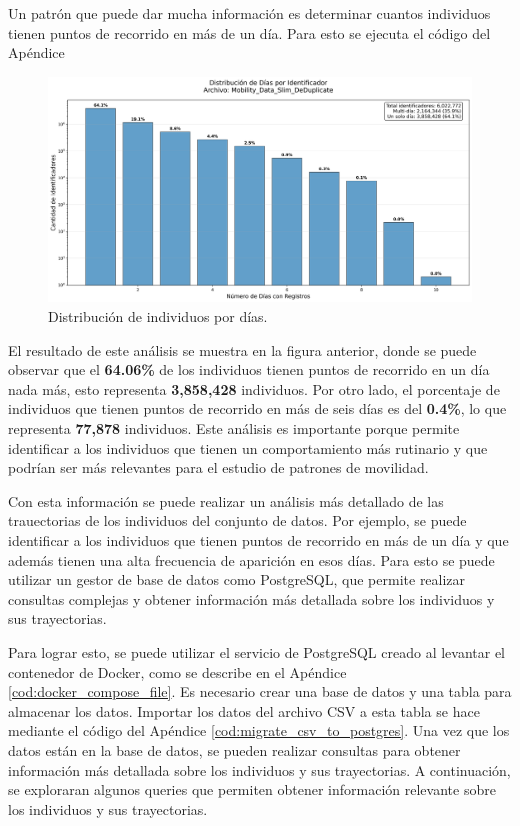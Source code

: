 Un patrón que puede dar mucha información es determinar cuantos individuos tienen puntos de recorrido en más de un día. Para esto se ejecuta el código del Apéndice 

\begin{figure}[H]
  \centering
  \includegraphics[width=\textwidth]{img/multi_day_analysis_Mobility_Data_Slim_DeDuplicate.png}
  \caption{Distribución de individuos por días.}
  \label{fig:multi_day_analysis}
\end{figure}

El resultado de este análisis se muestra en la figura anterior, donde se puede observar que el \textbf{64.06\%} de los individuos tienen puntos de recorrido en un día nada más, esto representa \textbf{3,858,428} individuos. Por otro lado, el porcentaje de individuos que tienen puntos de recorrido en más de seis días es del \textbf{0.4\%}, lo que representa \textbf{77,878} individuos. Este análisis es importante porque permite identificar a los individuos que tienen un comportamiento más rutinario y que podrían ser más relevantes para el estudio de patrones de movilidad. 

Con esta información se puede realizar un análisis más detallado de las trauectorias de los individuos del conjunto de datos. Por ejemplo, se puede identificar a los individuos que tienen puntos de recorrido en más de un día y que además tienen una alta frecuencia de aparición en esos días. Para esto se puede utilizar un gestor de base de datos como PostgreSQL, que permite realizar consultas complejas y obtener información más detallada sobre los individuos y sus trayectorias.

Para lograr esto, se puede utilizar el servicio de PostgreSQL creado al levantar el contenedor de Docker, como se describe en el Apéndice \ref{cod:docker_compose_file}. Es necesario crear una base de datos y una tabla para almacenar los datos. Importar los datos del archivo CSV a esta tabla se hace mediante el código del Apéndice \ref{cod:migrate_csv_to_postgres}. Una vez que los datos están en la base de datos, se pueden realizar consultas para obtener información más detallada sobre los individuos y sus trayectorias. A continuación, se exploraran algunos queries que permiten obtener información relevante sobre los individuos y sus trayectorias.

